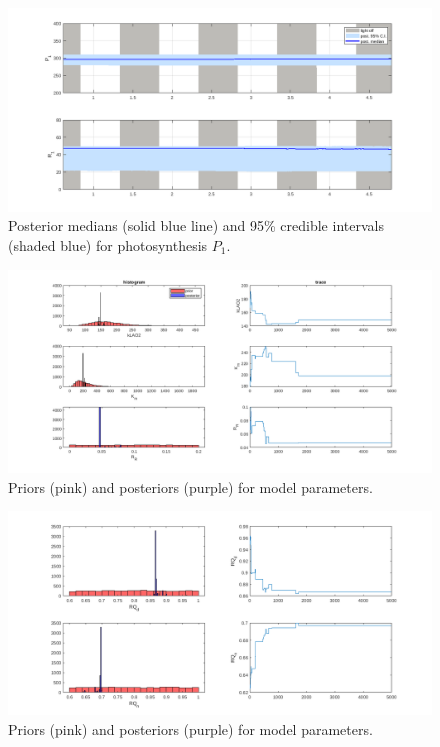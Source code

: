 \documentclass{ruthesis}
\begin{document}
\begin{figure}
	\centerline{\includegraphics[width=1.2\textwidth]{images_microalgae/plots_test/P_and_R}}
	\caption[.]{Posterior medians (solid blue line) and 95\% credible intervals (shaded blue) for photosynthesis $P_1$.}
	\label{fig:micro_exp_test_P}
\end{figure}


\begin{figure}
	\centerline{\includegraphics[width=1.3\textwidth]{images_microalgae/plots_test/model_parameters1}}
	\caption[.]{Priors (pink) and posteriors (purple) for model parameters.}
	\label{fig:micro_exp_test_parameters_model1}
\end{figure}

\begin{figure}
	\centerline{\includegraphics[width=1.3\textwidth]{images_microalgae/plots_test/model_parameters2}}
	\caption[.]{Priors (pink) and posteriors (purple) for model parameters.}
	\label{fig:micro_exp_test_parameters_model2}
\end{figure}
\end{document}
